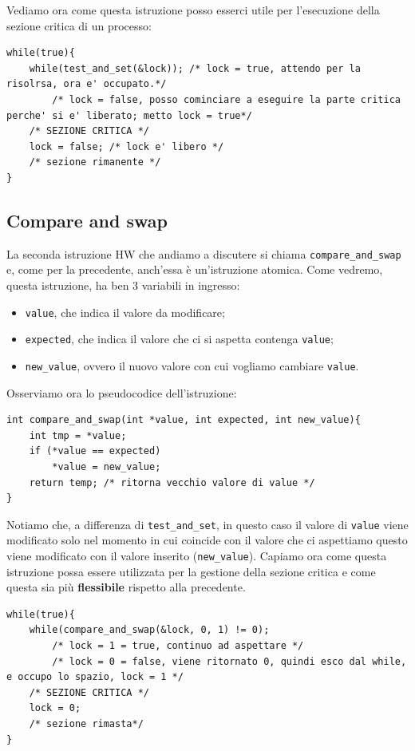 Vediamo ora come questa istruzione posso esserci utile per l'esecuzione della sezione critica di un processo:
\begin{lstlisting}[caption={Utilizzo \texttt{test\_and\_set}}]
while(true){
    while(test_and_set(&lock)); /* lock = true, attendo per la risolrsa, ora e' occupato.*/
        /* lock = false, posso cominciare a eseguire la parte critica perche' si e' liberato; metto lock = true*/
    /* SEZIONE CRITICA */
    lock = false; /* lock e' libero */ 
    /* sezione rimanente */
}
\end{lstlisting}
% 
\subsection{Compare and swap}
La seconda istruzione HW che andiamo a discutere si chiama \texttt{compare\_and\_swap} e, come per la precedente, anch'essa è un'istruzione atomica. Come vedremo, questa istruzione, ha ben 3 variabili in ingresso:
\vspace{-5px}
\begin{itemize}
\setlength{\itemsep}{-.15 em}
    \item \texttt{value}, che indica il valore da modificare;
    \item \texttt{expected}, che indica il valore che ci si aspetta contenga \texttt{value};
    \item \texttt{new\_value}, ovvero il nuovo valore con cui vogliamo cambiare \texttt{value}.
\end{itemize}
Osserviamo ora lo pseudocodice dell'istruzione:
\begin{lstlisting}
int compare_and_swap(int *value, int expected, int new_value){
    int tmp = *value;
    if (*value == expected)
        *value = new_value;
    return temp; /* ritorna vecchio valore di value */
}
\end{lstlisting}
Notiamo che, a differenza di \texttt{test\_and\_set}, in questo caso il valore di \texttt{value} viene modificato solo nel momento in cui coincide con il valore che ci aspettiamo questo viene modificato con il valore inserito (\texttt{new\_value}). Capiamo ora come questa istruzione possa essere utilizzata per la gestione della sezione critica e come questa sia più \textbf{flessibile} rispetto alla precedente.
\begin{lstlisting}[caption={Utilizzo di \texttt{compare\_and\_swap}}]
while(true){
    while(compare_and_swap(&lock, 0, 1) != 0); 
        /* lock = 1 = true, continuo ad aspettare */
        /* lock = 0 = false, viene ritornato 0, quindi esco dal while, e occupo lo spazio, lock = 1 */
    /* SEZIONE CRITICA */
    lock = 0;
    /* sezione rimasta*/
}
\end{lstlisting}

